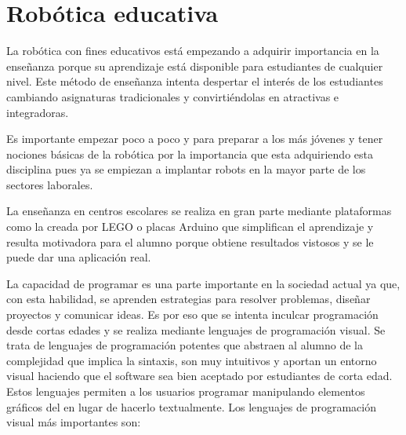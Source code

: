 \section{Robótica educativa}
\label{sec:educativa}


La robótica con fines educativos está empezando a adquirir importancia en la enseñanza porque su aprendizaje está disponible para estudiantes de cualquier nivel. Este método de enseñanza intenta despertar el interés de los estudiantes cambiando asignaturas tradicionales y convirtiéndolas en atractivas e integradoras. \newline

Es importante empezar poco a poco y para preparar a los más jóvenes y tener nociones básicas de la robótica por la importancia que esta adquiriendo esta disciplina pues ya se empiezan a implantar robots en la mayor parte de los sectores laborales. \newline

La enseñanza en centros escolares se realiza en gran parte mediante plataformas como la creada por LEGO o placas Arduino que simplifican el aprendizaje y resulta motivadora para el alumno porque obtiene resultados vistosos y se le puede dar una aplicación real. \newline



La capacidad de programar es una parte importante en la sociedad actual ya que, con esta habilidad, se aprenden estrategias para resolver problemas, diseñar proyectos y comunicar ideas. Es por eso que se intenta inculcar programación desde cortas edades y se realiza mediante lenguajes de programación visual. Se trata de lenguajes de programación potentes que abstraen al alumno de la complejidad que implica la sintaxis, son muy intuitivos y aportan un entorno visual haciendo que el software sea bien aceptado por estudiantes de corta edad. Estos lenguajes permiten a los usuarios programar manipulando elementos gráficos del en lugar de hacerlo textualmente. Los lenguajes de programación visual más importantes son: 

